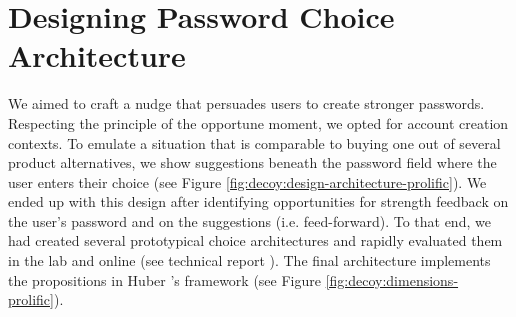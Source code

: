 \section{Designing Password Choice Architecture}
We aimed to craft a nudge that persuades users to create stronger passwords. Respecting the principle of the opportune moment, we opted for account creation contexts. To emulate a situation that is comparable to buying one out of several product alternatives, we show suggestions beneath the password field where the user enters their choice (see Figure \ref{fig:decoy:design-architecture-prolific}). We ended up with this design after identifying opportunities for strength feedback on the user's password and on the suggestions (i.e. feed-forward). To that end, we had created several prototypical choice architectures and rapidly evaluated them in the lab and online (see technical report \cite{Seitz2016DecoyEffectReport}). The final architecture implements the propositions in Huber \etal's framework (see Figure \ref{fig:decoy:dimensions-prolific}).

